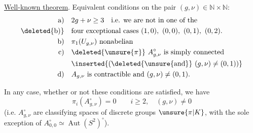 

\uline{Well-known theorem}. Equivalent conditions on the pair $(g,\nu)\in\mathbb N\times\mathbb N$:
\[
\begin{aligned}
\text{a)}\quad &2g+\nu\geq3\quad\text{i.e. we are not in one of the}\\
\text{\deleted{b)}}\quad &\text{four exceptional cases }(1,0),\ (0,0),\ (0,1),\ (0,2).\\
\text{b)}\quad &\pi_1(U_{g,\nu})\text{ nonabelian}\\
\text{c)}\quad &\deleted{\unsure{\pi}}\ A_{g,\nu}^{\circ}\text{ is simply connected}\\
&\inserted{\text{(}\deleted{\unsure{\text{and}}}\ (g,\nu)\ne(0,1)\text{)}}\\
\text{d)}\quad &A_{g,\nu}\text{ is contractible and }(g,\nu)\ne(0,1).
\end{aligned}
\]

In any case, whether or not these conditions are satisfied, we have 
\[
\pi_i(A_{g,\nu}^{\circ})=0\qquad i\geq2,\quad(g,\nu)\ne0
\]
(i.e.  $A_{g,\nu}^{\circ}$ are classifying spaces of discrete groups $\unsure{\pi|K}$, with the sole exception of $A_{0,0}^{\circ}\simeq\operatorname{Aut}(S^2)^{\circ}$).

